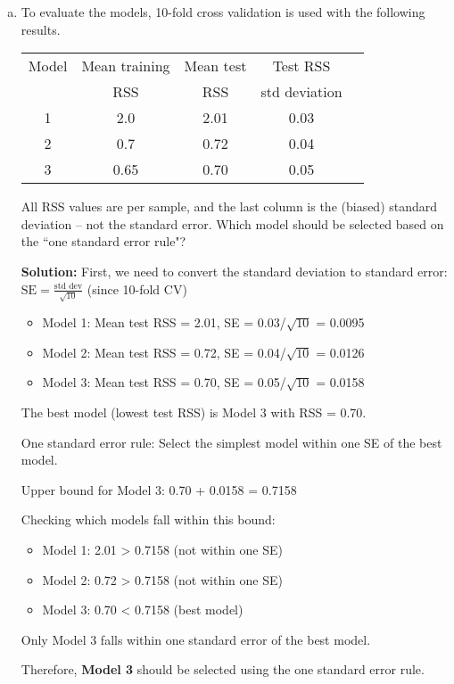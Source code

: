 \documentclass[11pt]{article}
\begin{document}
\begin{enumerate}
\begin{enumerate}[(a)]
  \item To evaluate the models, 10-fold cross validation is used with the following results.
\begin{center}
\begin{tabular}[h]{|c|c|c|c|c|} \hline
Model & Mean training  & Mean test      & Test RSS \\
      & RSS            & RSS            & std deviation \\ \hline
1 & 2.0  & 2.01 & 0.03 \\ \hline
2 & 0.7  & 0.72 & 0.04 \\ \hline
3 & 0.65 & 0.70 & 0.05 \\ \hline
\end{tabular}
\end{center}
All RSS values are per sample, and the last column is the (biased)
standard deviation -- not the standard error.
Which model should be selected based on the ``one standard error rule"?

  \textbf{Solution:}
  First, we need to convert the standard deviation to standard error:
  $\text{SE} = \frac{\text{std dev}}{\sqrt{10}}$ (since 10-fold CV)
  
  \begin{itemize}
    \item Model 1: Mean test RSS = 2.01, SE = 0.03/$\sqrt{10}$ = 0.0095
    \item Model 2: Mean test RSS = 0.72, SE = 0.04/$\sqrt{10}$ = 0.0126  
    \item Model 3: Mean test RSS = 0.70, SE = 0.05/$\sqrt{10}$ = 0.0158
  \end{itemize}
  
  The best model (lowest test RSS) is Model 3 with RSS = 0.70.
  
  One standard error rule: Select the simplest model within one SE of the best model.
  
  Upper bound for Model 3: 0.70 + 0.0158 = 0.7158
  
  Checking which models fall within this bound:
  \begin{itemize}
    \item Model 1: 2.01 > 0.7158 (not within one SE)
    \item Model 2: 0.72 > 0.7158 (not within one SE)
    \item Model 3: 0.70 < 0.7158 (best model)
  \end{itemize}
  
  Only Model 3 falls within one standard error of the best model.
  
  Therefore, \textbf{Model 3} should be selected using the one standard error rule.

\end{enumerate}



\end{enumerate}
\end{document}
